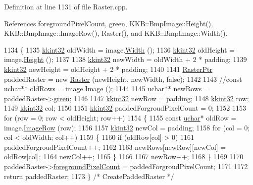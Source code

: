 Definition at line 1131 of file Raster.\+cpp.



References foreground\+Pixel\+Count, green, K\+K\+B\+::\+Bmp\+Image\+::\+Height(), K\+K\+B\+::\+Bmp\+Image\+::\+Image\+Row(), Raster(), and K\+K\+B\+::\+Bmp\+Image\+::\+Width().


\begin{DoxyCode}
1134 \{
1135   \hyperlink{namespace_k_k_b_a8fa4952cc84fda1de4bec1fbdd8d5b1b}{kkint32}  oldWidth  = image.\hyperlink{class_k_k_b_1_1_bmp_image_a843e1821a1191100b03da9258e77e356}{Width}  ();
1136   \hyperlink{namespace_k_k_b_a8fa4952cc84fda1de4bec1fbdd8d5b1b}{kkint32}  oldHeight = image.\hyperlink{class_k_k_b_1_1_bmp_image_ae9a8a8f35af1c7d4b2fabbea4b92cc23}{Height} ();
1137 
1138   \hyperlink{namespace_k_k_b_a8fa4952cc84fda1de4bec1fbdd8d5b1b}{kkint32}  newWidth  = oldWidth  + 2 * padding;
1139   \hyperlink{namespace_k_k_b_a8fa4952cc84fda1de4bec1fbdd8d5b1b}{kkint32}  newHeight = oldHeight + 2 * padding;
1140 
1141   \hyperlink{class_k_k_b_1_1_raster}{RasterPtr}  paddedRaster = \textcolor{keyword}{new} \hyperlink{class_k_k_b_1_1_raster_a19ec88efff547c1fcda863172fef620b}{Raster} (newHeight, newWidth, \textcolor{keyword}{false});
1142 
1143   \textcolor{comment}{//const uchar**  oldRows = image.Image ();}
1144 
1145   \hyperlink{namespace_k_k_b_ace9969169bf514f9ee6185186949cdf7}{uchar}**  newRows = paddedRaster->\hyperlink{class_k_k_b_1_1_raster_a2d2238911145488e226cd2e34fc8448c}{green};
1146 
1147   \hyperlink{namespace_k_k_b_a8fa4952cc84fda1de4bec1fbdd8d5b1b}{kkint32}  newRow = padding;
1148   \hyperlink{namespace_k_k_b_a8fa4952cc84fda1de4bec1fbdd8d5b1b}{kkint32}  row;
1149   \hyperlink{namespace_k_k_b_a8fa4952cc84fda1de4bec1fbdd8d5b1b}{kkint32}  col;
1150 
1151   \hyperlink{namespace_k_k_b_a8fa4952cc84fda1de4bec1fbdd8d5b1b}{kkint32}  paddedForgroudPixelCount = 0;
1152 
1153   \textcolor{keywordflow}{for}  (row = 0;  row < oldHeight;  row++)
1154   \{
1155     \textcolor{keyword}{const} \hyperlink{namespace_k_k_b_ace9969169bf514f9ee6185186949cdf7}{uchar}* oldRow = image.\hyperlink{class_k_k_b_1_1_bmp_image_ab0d6fac104e1b68ac72e4c7b57dc5ead}{ImageRow} (row);
1156     
1157     \hyperlink{namespace_k_k_b_a8fa4952cc84fda1de4bec1fbdd8d5b1b}{kkint32}  newCol = padding;
1158     \textcolor{keywordflow}{for}  (col = 0; col < oldWidth;  col++)
1159     \{
1160       \textcolor{keywordflow}{if}  (oldRow[col] > 0)
1161          paddedForgroudPixelCount++;
1162 
1163       newRows[newRow][newCol] = oldRow[col];
1164       newCol++;
1165     \}
1166 
1167     newRow++;
1168   \}
1169 
1170   paddedRaster->\hyperlink{class_k_k_b_1_1_raster_aa7e86253f4b9c347da718732e44b60e8}{foregroundPixelCount} = paddedForgroudPixelCount;
1171 
1172   \textcolor{keywordflow}{return}  paddedRaster; 
1173 \}  \textcolor{comment}{/* CreatePaddedRaster */}
\end{DoxyCode}
